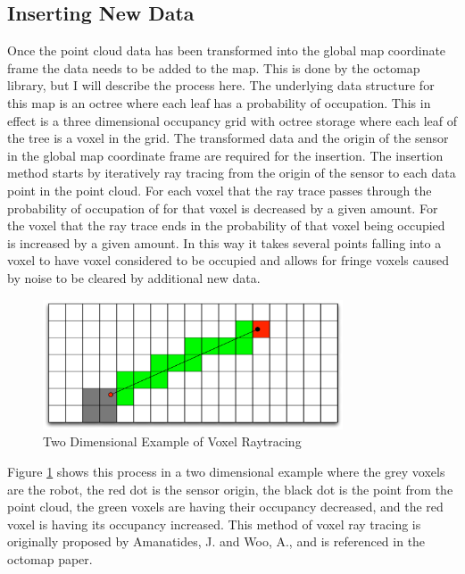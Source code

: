 \documentclass[journal]{IEEEtran}
\begin{document}
  \subsection{Inserting New Data}
  Once the point cloud data has been transformed into the global map
  coordinate frame the data needs to be added to the map. This is done by the
  octomap library, but I will describe the process here. The underlying data
  structure for this map is an octree where each leaf has a probability of
  occupation. This in effect is a three dimensional occupancy grid with octree
  storage where each leaf of the tree is a voxel in the grid. The transformed
  data and the origin of the sensor in the global map coordinate frame are
  required for the insertion. The insertion method starts by iteratively ray
  tracing from the origin of the sensor to each data point in the point cloud.
  For each voxel that the ray trace passes through the probability of
  occupation of for that voxel is decreased by a given amount. For the voxel
  that the ray trace ends in the probability of that voxel being occupied is
  increased by a given amount. In this way it takes several points falling
  into a voxel to have voxel considered to be occupied and allows for fringe
  voxels caused by noise to be cleared by additional new data. 
  
  \begin{figure}[here]
    \centering
    \includegraphics[width=3.5in,keepaspectratio]{raytrace.pdf}
    \caption{Two Dimensional Example of Voxel Raytracing}
    \label{fig:voxel_raytrace}
  \end{figure}
  
  Figure \ref{fig:voxel_raytrace} shows this process in a two dimensional
  example where the grey voxels are the robot, the red dot is the sensor
  origin, the black dot is the point from the point cloud, the green voxels
  are having their occupancy decreased, and the red voxel is having its
  occupancy increased. This method of voxel ray tracing is originally proposed
  by Amanatides, J. and Woo, A., and is referenced in the octomap
  paper.\cite{amanatides1987fast}
  
\end{document}
